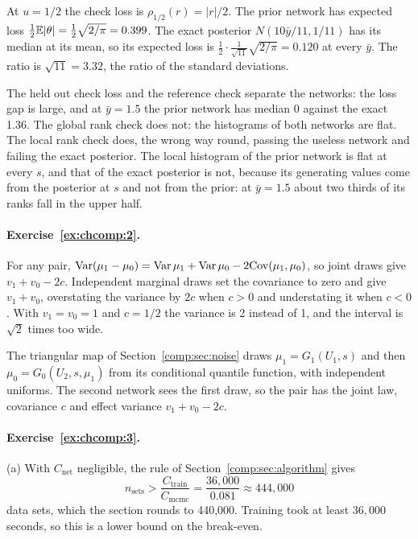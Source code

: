 At $u = 1/2$ the check loss is $\rho_{1/2}(r) = |r|/2$. The prior network has expected loss $\frac12\mathbb{E}|\theta| = \frac12\sqrt{2/\pi} = 0.399$. The exact posterior $N(10\bar y/11, 1/11)$ has its median at its mean, so its expected loss is $\frac12\cdot\frac{1}{\sqrt{11}}\sqrt{2/\pi} = 0.120$ at every $\bar y$. The ratio is $\sqrt{11} = 3.32$, the ratio of the standard deviations. 

The held out check loss and the reference check separate the networks: the loss gap is large, and at $\bar y = 1.5$ the prior network has median 0 against the exact 1.36. The global rank check does not: the histograms of both networks are flat. The local rank check does, the wrong way round, passing the useless network and failing the exact posterior. The local histogram of the prior network is flat at every $s$, and that of the exact posterior is not, because its generating values come from the posterior at $s$ and not from the prior: at $\bar y = 1.5$ about two thirds of its ranks fall in the upper half.

\paragraph{Exercise~\ref{ex:chcomp:2}.} For any pair, $\mathrm{Var}(\mu_1 - \mu_0) = \mathrm{Var}\,\mu_1 + \mathrm{Var}\,\mu_0 - 2\mathrm{Cov}(\mu_1, \mu_0)$, so joint draws give $v_1 + v_0 - 2c$. Independent marginal draws set the covariance to zero and give $v_1 + v_0$, overstating the variance by $2c$ when $c > 0$ and understating it when $c < 0$. With $v_1 = v_0 = 1$ and $c = 1/2$ the variance is 2 instead of 1, and the interval is $\sqrt2$ times too wide.

The triangular map of Section~\ref{comp:sec:noise} draws $\mu_1 = G_1(U_1, s)$ and then $\mu_0 = G_0(U_2, s, \mu_1)$ from its conditional quantile function, with independent uniforms. The second network sees the first draw, so the pair has the joint law, covariance $c$ and effect variance $v_1 + v_0 - 2c$.

\paragraph{Exercise~\ref{ex:chcomp:3}.} (a) With $C_{\mathrm{net}}$ negligible, the rule of Section~\ref{comp:sec:algorithm} gives
\[
n_{\mathrm{sets}} > \frac{C_{\mathrm{train}}}{C_{\mathrm{mcmc}}} = \frac{36{,}000}{0.081} \approx 444{,}000
\]
data sets, which the section rounds to 440,000. Training took at least $36{,}000$ seconds, so this is a lower bound on the break-even.


